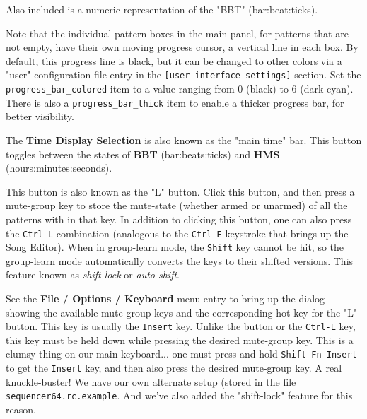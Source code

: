    Also included is a numeric representation of the "BBT" (bar:beat:ticks).
 
   Note that the individual pattern boxes in the main panel, for
   patterns that are not empty, have their own
   moving progress cursor, a vertical line in each box.
   By default, this progress line is black, but it can be changed to
   other colors via a "user" configuration file entry in the 
   \texttt{[user-interface-settings]} section.
   Set the \texttt{progress\_bar\_colored} item to a value ranging from 0
   (black) to 6 (dark cyan).
   There is also a \texttt{progress\_bar\_thick} item to enable a thicker
   progress bar, for better visibility.


   The \textbf{Time Display Selection} is also known as the "main time" bar.
   This button toggles between the states of \textbf{BBT} (bar:beats:ticks)
   and \textbf{HMS} (hours:minutes:seconds).

   This button is also known as the "L" button.
   Click this button, and then press a mute-group key
   to store the mute-state (whether armed or unarmed)
   of all the patterns with in that key.
   In addition to clicking this button, one can also press
   the \texttt{Ctrl-L} combination (analogous to the \texttt{Ctrl-E}
   keystroke that brings up the Song Editor).
   When in group-learn mode, the \texttt{Shift} key cannot be hit, so the
   group-learn mode automatically converts the keys to their shifted versions.
   This feature known as \textsl{shift-lock} or \textsl{auto-shift}.

   See the \textbf{File / Options / Keyboard} menu entry to bring up the
   dialog showing the available mute-group keys and the corresponding
   hot-key for the "L" button.
   This key is usually the \texttt{Insert} key.  Unlike the button or the
   \texttt{Ctrl-L} key, this key must be held down while pressing the desired
   mute-group key.
   This is a clumsy thing on our main keyboard... one must press and hold
   \texttt{Shift-Fn-Insert} to get the \texttt{Insert} key, and then also
   press the desired mute-group key.  A real knuckle-buster!
   We have our own alternate setup (stored in the file
   \texttt{sequencer64.rc.example}.
   And we've also added the "shift-lock" feature for this reason.

